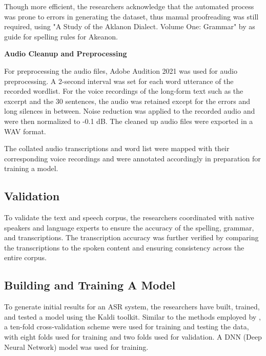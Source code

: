 Though more efficient, the researchers acknowledge that the automated process was prone to errors in generating the dataset, thus manual proofreading was still required, using "A Study of the Aklanon Dialect. Volume One: Grammar" by  as guide for spelling rules for Akeanon.

\textbf{Audio Cleanup and Preprocessing}

For preprocessing the audio files, Adobe Audition 2021 was used for audio preprocessing. A 2-second interval was set for each word utterance of the recorded wordlist. For the voice recordings of the long-form text such as the excerpt and the 30 sentences, the audio was retained except for the errors and long silences in between. Noise reduction was applied to the recorded audio and were then normalized to -0.1 dB. The cleaned up audio files were exported in a WAV format.

The collated audio transcriptions and word list were mapped with their corresponding voice recordings and were annotated accordingly in preparation for training a model.

\subsection{Validation}

To validate the text and speech corpus, the researchers coordinated with native speakers and language experts to ensure the accuracy of the spelling, grammar, and transcriptions. The transcription accuracy was further verified by comparing the transcriptions to the spoken content and ensuring consistency across the entire corpus.

\subsection{Building and Training A Model}
To generate initial results for an ASR system, the researchers have built, trained, and tested a model using the Kaldi toolkit. Similar to the methods employed by , a ten-fold cross-validation scheme were used for training and testing the data, with eight folds used for training and two folds used for validation. A DNN (Deep Neural Network) model was used for training.